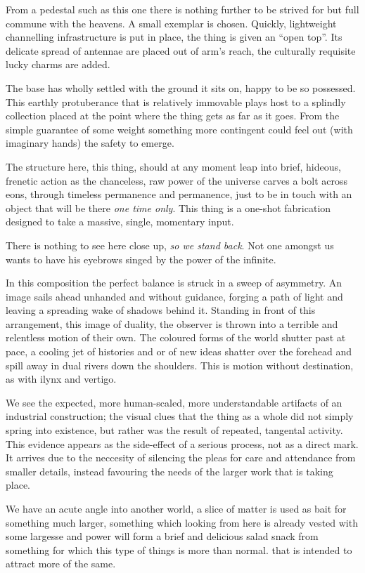 \documentclass{book}
\begin{document}
From a pedestal such as this one there is nothing further to be strived for but
full commune with the heavens. A small exemplar is chosen. Quickly, lightweight
channelling infrastructure is put in place, the thing is given an ``open top''.
Its delicate spread of antennae are placed out of arm's reach, the culturally
requisite lucky charms are added.

The base has wholly settled with the ground it sits on, happy to be so
possessed. This earthly protuberance that is relatively immovable plays host to
a splindly collection placed at the point where the thing gets as far as it
goes. From the simple guarantee of some weight something more contingent could
feel out (with imaginary hands) the safety to emerge.

The structure here, this thing, should at any moment leap into brief, hideous,
frenetic action as the chanceless, raw power of the universe carves a bolt
across eons, through timeless permanence and permanence, just to be in touch
with an object that will be there \emph{one time only}. This thing is a
one-shot fabrication designed to take a massive, single, momentary input.

There is nothing to see here close up, \emph{so we stand back}. Not one amongst
us wants to have his eyebrows singed by the power of the infinite.

In this composition the perfect balance is struck in a sweep of asymmetry. An
image sails ahead unhanded and without guidance, forging a path of light and
leaving a spreading wake of shadows behind it. Standing in front of this
arrangement, this image of duality, the observer is thrown into a terrible and
relentless motion of their own. The coloured forms of the world shutter past at
pace, a cooling jet of histories and or of new ideas shatter over the forehead
and spill away in dual rivers down the shoulders. This is motion without
destination, as with ilynx and vertigo.

We see the expected, more human-scaled, more understandable artifacts of an
industrial construction; the visual clues that the thing as a whole did not
simply spring into existence, but rather was the result of repeated, tangental
activity. This evidence appears as the side-effect of a serious process, not as
a direct mark. It arrives due to the neccesity of silencing the pleas for care
and attendance from smaller details, instead favouring the needs of the larger
work that is taking place.

We have an acute angle into another world, a slice of matter is used as bait
for something much larger, something which looking from here is already vested
with some largesse and power will form a brief and delicious salad snack from
something for which this type of things is more than normal. that is intended
to attract more of the same.
\end{document}
